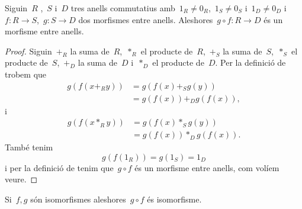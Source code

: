 \documentclass[../../main.tex]{subfiles}
\begin{document}
	\begin{proposition}
		\label{prop:operació morfismes entre anells és morfisme entre anells}
		Siguin~\(R\) ,~\(S\) i~\(D\) tres anells commutatius amb~\(1_{R}\neq0_{R}\),~\(1_{S}\neq0_{S}\) i~\(1_{D}\neq0_{D}\) i~\(f\colon R\longrightarrow S\),~\(g\colon S\longrightarrow D\) dos morfismes entre anells.
		Aleshores~\(g\circ f\colon R\longrightarrow D\) és un morfisme entre anells.
		\begin{proof}
			Siguin~\(+_{R}\) la suma de~\(R\),~\(\ast_{R}\) el producte de~\(R\),~\(+_{S}\) la suma de~\(S\),~\(\ast_{S}\) el producte de~\(S\),~\(+_{D}\) la suma de~\(D\) i~\(\ast_{D}\) el producte de~\(D\).
			Per la definició de  trobem que
			\begin{align*}
			g(f(x+_{R}y))&=g(f(x)+_{S}g(y))\\
			&=g(f(x))+_{D}g(f(x)),
			\end{align*}
			i
			\begin{align*}
			g(f(x\ast_{R}y))&=g(f(x)\ast_{S}g(y))\\
			&=g(f(x))\ast_{D}g(f(x)).
			\end{align*}
			També tenim
			\[
			    g(f(1_{R}))=g(1_{S})=1_{D}
			\]
			i per la definició de  tenim que~\(g\circ f\) és un morfisme entre anells, com volíem veure.
		\end{proof}
	\end{proposition}
	\begin{corollary}
		\label{corollary:conjugació isomorfismes enre anells és isomorfisme entre anells}
		Si~\(f,g\) són isomorfismes aleshores~\(g\circ f\) és isomorfisme.
	\end{corollary}
\end{document}
